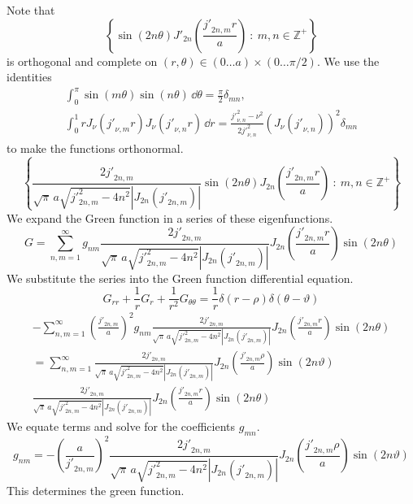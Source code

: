 {\begin{Solution}
\begin{enumerate}
    Note that 
    \[
    \left\{ \sin(2 n \theta) {J'}_{2n} \left( \frac{{j'}_{2n,m} r}{a} \right) \ :\ 
      m,n \in \mathbb{Z}^+ \right\}
    \]
    is orthogonal and complete on 
    $(r, \theta) \in (0 \ldots a) \times (0 \ldots \pi/2)$.
    We use the identities
    \begin{gather*}
      \int_0^\pi \sin(m \theta) \sin(n \theta) \,\dd \theta 
      = \frac{\pi}{2} \delta_{m n}, \\
      \int_0^1 r J_\nu({j'}_{\nu,m} r) J_\nu({j'}_{\nu,n} r) \,\dd r 
      = \frac{{j'}_{\nu,n}^2 - \nu^2}{2 {j'}_{\nu,n}^2} 
      \left( J_\nu({j'}_{\nu,n}) \right)^2
      \delta_{m n}
    \end{gather*}
    to make the functions orthonormal.
    \[
    \left\{ \frac{ 2 {j'}_{2n,m} }
      { \sqrt{\pi}\, a \sqrt{{j'}_{2n,m}^2 - 4 n^2} |J_{2n}({j'}_{2n,m})| }
      \sin(2n \theta) J_{2n} \left( \frac{{j'}_{2n,m} r}{a} \right) \ :\ 
      m,n \in \mathbb{Z}^+ \right\}
    \]
    We expand the Green function in a series of these eigenfunctions.
    \[
    G = \sum_{n,m = 1}^\infty g_{n m} \frac{ 2 {j'}_{2n,m} }
    { \sqrt{\pi}\, a \sqrt{{j'}_{2n,m}^2 - 4 n^2} |J_{2n}({j'}_{2n,m})| }
    J_{2n} \left( \frac{{j'}_{2n,m} r}{a} \right) \sin(2n \theta) 
    \]
    We substitute the series into the Green function differential
    equation.
    \[
    G_{r r} + \frac{1}{r} G_r + \frac{1}{r^2} G_{\theta \theta} 
    = \frac{1}{r} \delta(r - \rho) \delta(\theta - \vartheta)
    \]
    \begin{multline*}
      - \sum_{n,m = 1}^\infty \left( \frac{{j'}_{2n,m}}{a} \right)^2
      g_{n m} \frac{ 2 {j'}_{2n,m} }
      { \sqrt{\pi}\, a \sqrt{{j'}_{2n,m}^2 - 4 n^2} |J_{2n}({j'}_{2n,m})| }
      J_{2n} \left( \frac{{j'}_{2n,m} r}{a} \right) \sin(2n \theta) 
      \\
      = \sum_{n,m = 1}^\infty \frac{ 2 {j'}_{2n,m} }
      { \sqrt{\pi}\, a \sqrt{{j'}_{2n,m}^2 - 4 n^2} |J_{2n}({j'}_{2n,m})| }
      J_{2n} \left( \frac{{j'}_{2n,m} \rho}{a} \right) \sin(2n
      \vartheta) 
      \\
      \frac{ 2 {j'}_{2n,m} }
      { \sqrt{\pi}\, a \sqrt{{j'}_{2n,m}^2 - 4 n^2} |J_{2n}({j'}_{2n,m})| }
      J_{2n} \left( \frac{{j'}_{2n,m} r}{a} \right) \sin(2n \theta)
    \end{multline*}
    We equate terms and solve for the coefficients $g_{m n}$.
    \[
    g_{n m} = - \left( \frac{a}{{j'}_{2n,m}} \right)^2
    \frac{ 2 {j'}_{2n,m} }
    { \sqrt{\pi}\, a \sqrt{{j'}_{2n,m}^2 - 4 n^2} |J_{2n}({j'}_{2n,m})| }
    J_{2n} \left( \frac{{j'}_{2n,m} \rho}{a} \right) \sin(2n \vartheta)
    \]
    This determines the green function.


\end{enumerate}
\end{Solution}}
